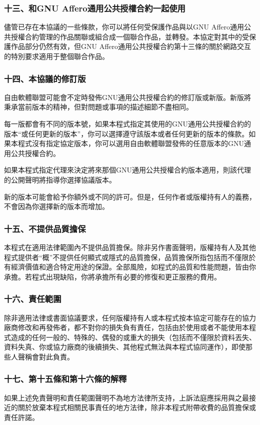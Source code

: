 \subsubsection{十三、和GNU Affero通用公共授權合約一起使用}
儘管已存在本協議的一些條款，你可以將任何受保護作品與以GNU Affero通用公共授權合約管理的作品關聯或組合成一個聯合作品，並轉發。本協定對其中的受保護作品部分仍然有效，但GNU Affero通用公共授權合約第十三條的關於網路交互的特別要求適用于整個聯合作品。
\subsubsection{十四、本協議的修訂版}
自由軟體聯盟可能會不定時發佈GNU通用公共授權合約的修訂版或新版。新版將秉承當前版本的精神，但對問題或事項的描述細節不盡相同。\par
每一版都會有不同的版本號，如果本程式指定其使用的GNU通用公共授權合約的版本“或任何更新的版本”，你可以選擇遵守該版本或者任何更新的版本的條款。如果本程式沒有指定協定版本，你可以選用自由軟體聯盟發佈的任意版本的GNU通用公共授權合約。\par
如果本程式指定代理來決定將來那個GNU通用公共授權合約版本適用，則該代理的公開聲明將指導你選擇協議版本。\par
新的版本可能會給予你額外或不同的許可。但是，任何作者或版權持有人的義務，不會因為你選擇新的版本而增加。
\subsubsection{十五、不提供品質擔保}
本程式在適用法律範圍內不提供品質擔保。除非另作書面聲明，版權持有人及其他程式提供者“概”不提供任何顯式或隱式的品質擔保，品質擔保所指包括而不僅限於有經濟價值和適合特定用途的保證。全部風險，如程式的品質和性能問題，皆由你承擔。若程式出現缺陷，你將承擔所有必要的修復和更正服務的費用。
\subsubsection{十六、責任範圍}
除非適用法律或書面協議要求，任何版權持有人或本程式按本協定可能存在的協力廠商修改和再發佈者，都不對你的損失負有責任，包括由於使用或者不能使用本程式造成的任何一般的、特殊的、偶發的或重大的損失（包括而不僅限於資料丟失、資料失真、你或協力廠商的後續損失、其他程式無法與本程式協同運作），即使那些人聲稱會對此負責。
\subsubsection{十七、第十五條和第十六條的解釋}
如果上述免責聲明和責任範圍聲明不為地方法律所支持，上訴法庭應採用與之最接近的關於放棄本程式相關民事責任的地方法律，除非本程式附帶收費的品質擔保或責任許諾。
